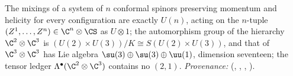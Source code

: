 The mixings of a system of $n$ conformal spinors preserving momentum and helicity for every configuration are exactly $U(n)$, acting on the $n$-tuple $(Z^{1}, \ldots, Z^{n}) \in \C^{n} \otimes \CS$ as $U \otimes 1$; the automorphism group of the hierarchy $\C^{2} \otimes \C^{3}$ is $(U(2) \times U(3))/K \cong S(U(2) \times U(3))$, and that of $\C^{3} \otimes \C^{3}$ has Lie algebra $\su(3) \oplus \su(3) \oplus \uu(1)$, dimension seventeen; the tensor ledger $\Lambda^{\bullet}(\C^{2} \otimes \C^{3})$ contains no $(2,1)$. \emph{Provenance:} \cite[Prop.~3.1, Thms.~4.1, 4.2, Prop.~5.3(2)]{ButlerT12} (, , , ).
